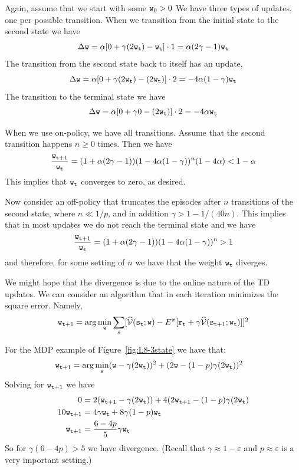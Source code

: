 Again, assume that we start with some ${\tt w}_0>0$ We have three
types of updates, one per possible transition. When we transition
from the initial state to the second state we have
\[
\Delta {\tt w}= \alpha[0+\gamma
(2{\tt w}_{\tt t})-{\tt w}_{\tt t}]\cdot
1=\alpha(2\gamma-1){\tt w}_{\tt t}
\]
The transition from the second state back to itself has an update,
\[
\Delta {\tt w}= \alpha[0+\gamma
(2{\tt w}_{\tt t})-(2{\tt w}_{\tt t})]\cdot 2
=-4\alpha(1-\gamma){\tt w}_{\tt t}
\]
The transition to the terminal state we have
\[
\Delta {\tt w}= \alpha[0+\gamma 0 -(2{\tt w}_{\tt t})]\cdot
2=-4\alpha {\tt w}_{\tt t}
\]



When we use on-policy, we have all transitions. Assume that the
second transition happens $n\geq 0$ times. Then we have
\[
\frac{{\tt w}_{{\tt t}+1}}{{\tt w}_{\tt t}}=(1+\alpha(2\gamma-1))(1-4\alpha(1-\gamma))^n(1-4\alpha)<
1-\alpha
\]
This implies that ${\tt w}_{\tt t}$ converges to zero, as desired.

Now consider an off-policy that truncates the episodes after $n$
transitions of the second state, where $n\ll 1/p$, and in addition
$\gamma> 1-1/(40n)$. This implies that in most updates we do not
reach the terminal state and we have
\[
\frac{{\tt w}_{{\tt t}+1}}{{\tt w}_{\tt t}}=(1+\alpha(2\gamma-1))(1-4\alpha(1-\gamma))^n>1
\]
and therefore, for some setting of $n$ we have that the weight
${\tt w}_{\tt t}$ diverges.

We might hope that the divergence is due to the online nature of the
TD updates. We can consider an algorithm that in each iteration
minimizes the square error. Namely,
\[
{\tt w}_{{\tt t}+1}=\arg\min_{\tt w}\sum_s
[\widehat{\mathcal{V}}({\tt s}_{\tt t};{\tt w})-E^\pi[{\tt r}_{\tt t}+\gamma\widehat{\mathcal{V}}({\tt s}_{{\tt t}+1};{\tt w}_{\tt t})]]^2
\]

For the MDP example of Figure~\ref{fig:L8-3state} we have that:
\begin{align*}
 {\tt w}_{{\tt t}+1} &= \arg\min_{\tt w} ({\tt w}-\gamma(2{\tt w}_{\tt t}))^2+(2{\tt w}-(1-p)\gamma(2{\tt w}_{\tt t}))^2
\end{align*}
Solving for ${\tt w}_{{\tt t}+1}$ we have
\begin{align*}
0&=  2({\tt w}_{{\tt t}+1}-\gamma(2{\tt w}_{\tt t}))+4(2{\tt w}_{{\tt t}+1}-(1-p)\gamma(2{\tt w}_{\tt t})\\
  10 {\tt w}_{{\tt t}+1}&=4\gamma {\tt w}_{\tt t} + 8\gamma(1-p){\tt w}_{\tt t}\\
  {\tt w}_{{\tt t}+1}&=\frac{6-4p}{5}\gamma {\tt w}_{\tt t}
\end{align*}
So for $\gamma(6-4p)>5$ we have divergence. (Recall that
$\gamma\approx 1-\varepsilon$ and $p\approx \varepsilon$ is a very
important setting.)

